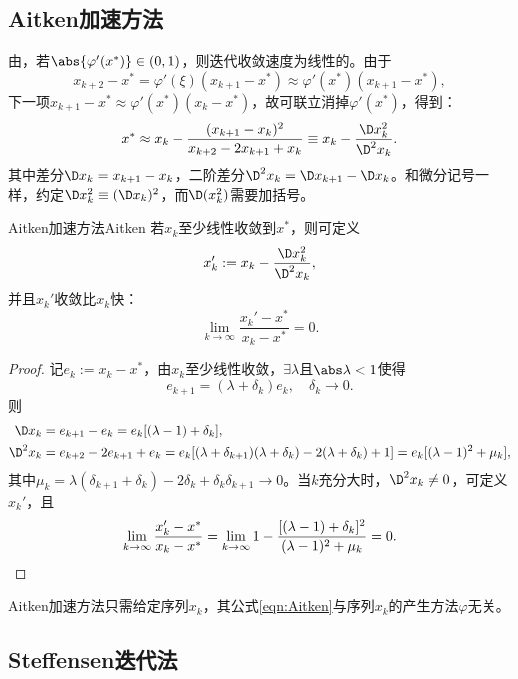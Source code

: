 \subsection{Aitken加速方法}

由，若$\abs{\varphi'(x^*)}\in(0,1)$，则迭代收敛速度为线性的。由于
\[
    x_{k+2}-x^*=\varphi'(\xi)(x_{k+1}-x^*)\approx\varphi'(x^*)(x_{k+1}-x^*),
\]
下一项$x_{k+1}-x^*\approx\varphi'(x^*)(x_k-x^*)$，故可联立消掉$\varphi'(x^*)$，得到：
\begin{equation}
    x^*\approx x_k-\frac{(x_{k+1}-x_k)^2}{x_{k+2}-2x_{k+1}+x_k}\equiv x_k-\frac{\D x_k^2}{\D^2 x_k}.
\end{equation}
其中差分$\D x_k=x_{k+1}-x_k$，二阶差分$\D^2x_k=\D x_{k+1}-\D x_k$。和微分记号一样，约定$\D x_k^2\equiv(\D x_k)^2$，而$\D(x_k^2)$需要加括号。

\begin{theorem}
    {Aitken加速方法}{Aitken}
    若$x_k$至少线性收敛到$x^*$，则可定义
    \begin{equation}
        \label{eqn:Aitken}
        x_k':=x_k-\frac{\D x_k^2}{\D^2x_k},
    \end{equation}
    并且$x_k'$收敛比$x_k$快：
    \[
        \lim_{k\to\infty}\frac{x_k'-x^*}{x_k-x^*}=0.
    \]
\end{theorem}

\begin{proof}
    记$e_k:=x_k-x^*$，由$x_k$至少线性收敛，$\exists\lambda$且$\abs\lambda<1$使得 
    \[
        e_{k+1}=(\lambda+\delta_k)e_k,\quad\delta_k\to 0.
    \]
    则
    \begin{align*}
        \D x_k&=e_{k+1}-e_k=e_k[(\lambda-1)+\delta_k],\\
        \D^2x_k&=e_{k+2}-2e_{k+1}+e_k=e_k[(\lambda+\delta_{k+1})(\lambda+\delta_k)-2(\lambda+\delta_k)+1]=e_k[(\lambda-1)^2+\mu_k],
    \end{align*}
    其中$\mu_k=\lambda(\delta_{k+1}+\delta_k)-2\delta_k+\delta_k\delta_{k+1}\to 0$。当$k$充分大时，$\D^2x_k\neq 0$，可定义$x_k'$，且
    \[
        \lim_{k\to\infty}\frac{x_k'-x^*}{x_k-x^*}=\lim_{k\to\infty}1-\frac{[(\lambda-1)+\delta_k]^2}{(\lambda-1)^2+\mu_k}=0.
        \qedhere
    \]
\end{proof}

\begin{remark}
    Aitken加速方法只需给定序列$x_k$，其公式\eqref{eqn:Aitken}与序列$x_k$的产生方法$\varphi$无关。
\end{remark}

\subsection{Steffensen迭代法}

